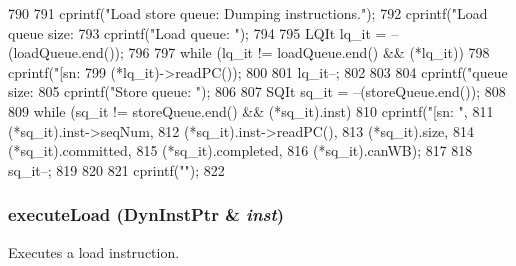 \begin{DoxyCode}
790 {
791     cprintf("Load store queue: Dumping instructions.\n");
792     cprintf("Load queue size: %
793     cprintf("Load queue: ");
794 
795     LQIt lq_it = --(loadQueue.end());
796 
797     while (lq_it != loadQueue.end() && (*lq_it)) {
798         cprintf("[sn:%
799                 (*lq_it)->readPC());
800 
801         lq_it--;
802     }
803 
804     cprintf("\nStore queue size: %
805     cprintf("Store queue: ");
806 
807     SQIt sq_it = --(storeQueue.end());
808 
809     while (sq_it != storeQueue.end() && (*sq_it).inst) {
810         cprintf("[sn:%
      \n",
811                 (*sq_it).inst->seqNum,
812                 (*sq_it).inst->readPC(),
813                 (*sq_it).size,
814                 (*sq_it).committed,
815                 (*sq_it).completed,
816                 (*sq_it).canWB);
817 
818         sq_it--;
819     }
820 
821     cprintf("\n");
822 }
\end{DoxyCode}
\hypertarget{classOzoneLWLSQ_a30c6332142c2ecca389ed6ee463c692b}{
\subsubsection[{executeLoad}]{ executeLoad ({\bf DynInstPtr} \& {\em inst})}}
\label{classOzoneLWLSQ_a30c6332142c2ecca389ed6ee463c692b}
Executes a load instruction. 


